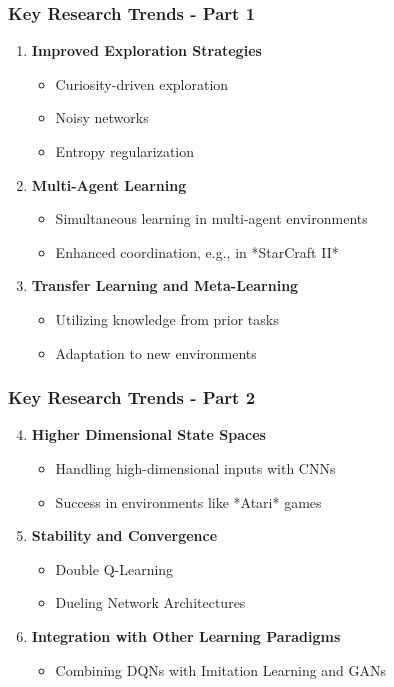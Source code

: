 \documentclass[aspectratio=169]{beamer}
\begin{document}
\begin{frame}[fragile]
    \frametitle{Key Research Trends - Part 1}
    \begin{enumerate}
        \item \textbf{Improved Exploration Strategies}
            \begin{itemize}
                \item Curiosity-driven exploration
                \item Noisy networks
                \item Entropy regularization
            \end{itemize}
        \item \textbf{Multi-Agent Learning}
            \begin{itemize}
                \item Simultaneous learning in multi-agent environments
                \item Enhanced coordination, e.g., in *StarCraft II*
            \end{itemize}
        \item \textbf{Transfer Learning and Meta-Learning}
            \begin{itemize}
                \item Utilizing knowledge from prior tasks
                \item Adaptation to new environments
            \end{itemize}
    \end{enumerate}
\end{frame}

\begin{frame}[fragile]
    \frametitle{Key Research Trends - Part 2}
    \begin{enumerate}
        \setcounter{enumi}{3} %
        \item \textbf{Higher Dimensional State Spaces}
            \begin{itemize}
                \item Handling high-dimensional inputs with CNNs
                \item Success in environments like *Atari* games
            \end{itemize}
        \item \textbf{Stability and Convergence}
            \begin{itemize}
                \item Double Q-Learning
                \item Dueling Network Architectures
            \end{itemize}
        \item \textbf{Integration with Other Learning Paradigms}
            \begin{itemize}
                \item Combining DQNs with Imitation Learning and GANs
            \end{itemize}
    \end{enumerate}
\end{frame}
\end{document}
